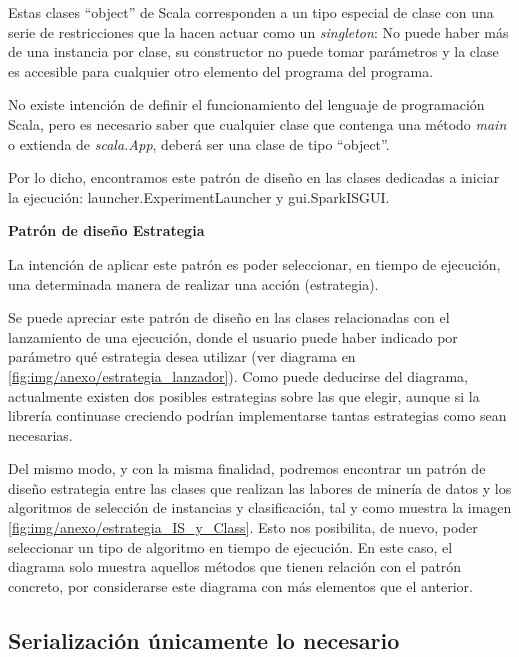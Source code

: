 Estas clases ``object'' de Scala corresponden a un tipo especial de clase con una serie de restricciones que la hacen actuar como un \textit{singleton}: No puede haber más de una instancia por clase, su constructor no puede tomar parámetros y la clase es accesible para cualquier otro elemento del programa del programa.

No existe intención de definir el funcionamiento del lenguaje de programación Scala, pero es necesario saber que cualquier clase que contenga una método \textit{main} o extienda de \textit{scala.App}, deberá ser una clase de tipo ``object''.

Por lo dicho, encontramos este patrón de diseño en las clases dedicadas a iniciar la ejecución: launcher.ExperimentLauncher y gui.SparkISGUI.


\textbf{Patrón de diseño Estrategia}

La intención de aplicar este patrón es poder seleccionar, en tiempo de ejecución, una determinada manera de realizar una acción (estrategia).

Se puede apreciar este patrón de diseño en las clases relacionadas con el lanzamiento de una ejecución, donde el usuario puede haber indicado por parámetro qué estrategia desea utilizar (ver diagrama en \ref{fig:img/anexo/estrategia_lanzador}). Como puede deducirse del diagrama, actualmente existen dos posibles estrategias sobre las que elegir, aunque si la librería continuase creciendo podrían implementarse tantas estrategias como sean necesarias. 


Del mismo modo, y con la misma finalidad, podremos encontrar un patrón de diseño estrategia entre las clases que realizan las labores de minería de datos y los algoritmos de selección de instancias y clasificación, tal y como muestra la imagen \ref{fig:img/anexo/estrategia_IS_y_Class}. Esto nos posibilita, de nuevo, poder seleccionar un tipo de algoritmo en tiempo de ejecución. En este caso, el diagrama solo muestra aquellos métodos que tienen relación con el patrón concreto, por considerarse este diagrama con más elementos que el anterior.


\subsection{Serialización únicamente lo necesario}

